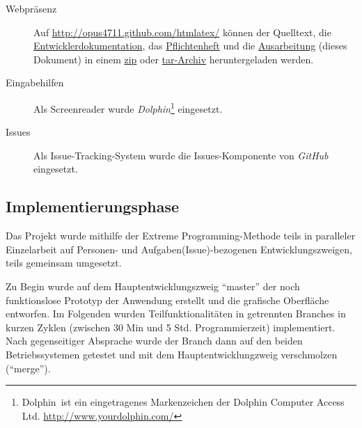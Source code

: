 \documentclass[	a4paper,		%
		titlepage, 		%
		fontsize=12pt		%
		]{scrartcl} 		%
\begin{document}
\begin{description}
 \item[Webpräsenz]
Auf \href{http://opus4711.github.com/htmlatex/}{http://opus4711.github.com/htmlatex/} können der Quelltext, die \href{http://opus4711.github.com/htmlatex/documentation/html/index.html}{Entwicklerdokumentation}, das \href{http://opus4711.github.com/htmlatex/Pflichtenheft/pflichtenheft.pdf}{Pflichtenheft} und die \href{http://opus4711.github.com/htmlatex/Ausarbeitung/ausarbeitung.pdf}{Ausarbeitung} (dieses Dokument) in einem \href{http://github.com/opus4711/htmlatex/zipball/master}{zip} oder \href{http://github.com/opus4711/htmlatex/tarball/master}{tar-Archiv} heruntergeladen werden.

 \item[Eingabehilfen]
 Als Screenreader wurde \emph{Dolphin}\footnote{Dolphin\textregistered ~ist ein eingetragenes Markenzeichen der Dolphin Computer Access Ltd. \newline \href{http://www.yourdolphin.com/}{http://www.yourdolphin.com/}} eingesetzt.

  \item[Issues]
Als Issue-Tracking-System wurde die Issues-Komponente von \emph{GitHub} eingesetzt.

 \end{description}

\subsection{Implementierungsphase}
Das Projekt wurde mithilfe der Extreme Programming-Methode teils in paralleler Einzelarbeit auf Personen- und Aufgaben(Issue)-bezogenen Entwicklungszweigen, teils gemeinsam umgesetzt.

Zu Begin wurde auf dem Hauptentwicklungszweig ``master'' der noch funktionslose Prototyp der Anwendung erstellt und die grafische Oberfläche entworfen. Im Folgenden wurden Teilfunktionalitäten in getrennten Branches in kurzen Zyklen (zwischen 30 Min und 5 Std. Programmierzeit) implementiert. Nach gegenseitiger Absprache wurde der Branch dann auf den beiden Betriebssystemen getestet und mit dem Hauptentwicklungzweig verschmolzen (``merge'').
\end{document}

